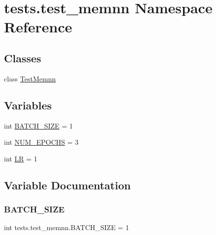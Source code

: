 \hypertarget{namespacetests_1_1test__memnn}{}\section{tests.\+test\+\_\+memnn Namespace Reference}
\label{namespacetests_1_1test__memnn}
\subsection*{Classes}
\begin{DoxyCompactItemize}
\item 
class \hyperlink{classtests_1_1test__memnn_1_1TestMemnn}{Test\+Memnn}
\end{DoxyCompactItemize}
\subsection*{Variables}
\begin{DoxyCompactItemize}
\item 
int \hyperlink{namespacetests_1_1test__memnn_ad1215c53a59eca972ffecfe07229c49c}{B\+A\+T\+C\+H\+\_\+\+S\+I\+ZE} = 1
\item 
int \hyperlink{namespacetests_1_1test__memnn_ae5ec84302f08d0f0df841afb6fc1fef6}{N\+U\+M\+\_\+\+E\+P\+O\+C\+HS} = 3
\item 
int \hyperlink{namespacetests_1_1test__memnn_a87ccdcaecd71ad2810a32591292724eb}{LR} = 1
\end{DoxyCompactItemize}


\subsection{Variable Documentation}
\mbox{\label{namespacetests_1_1test__memnn_ad1215c53a59eca972ffecfe07229c49c}} 
\subsubsection{\texorpdfstring{B\+A\+T\+C\+H\+\_\+\+S\+I\+ZE}{BATCH\_SIZE}}
{\footnotesize\ttfamily int tests.\+test\+\_\+memnn.\+B\+A\+T\+C\+H\+\_\+\+S\+I\+ZE = 1}



